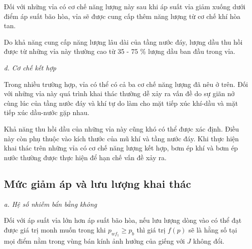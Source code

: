 \documentclass[12pt,a4paper]{report}
\begin{document}
Đối với những vỉa có cơ chế năng lượng này sau khi áp suất vỉa giảm xuống dưới điểm áp suất bão hòa, vỉa sẽ được cung cấp thêm năng lượng từ cơ chế khí hòa tan.

Do khả năng cung cấp năng lượng lâu dài của tầng nước đáy, lượng dầu thu hồi được từ những vỉa này thường cao từ 35 - 75 \% lượng dầu ban đầu trong vỉa.

\textit{d. Cơ chế kết hợp}

Trong nhiều trường hợp, vỉa có thể có cả ba cơ chế năng lượng đã nêu ở trên. Đối với những vỉa này quá trình khai thác thường dễ xảy ra vấn đề do sự giãn nở cùng lúc của tầng nước đáy và khí tự do làm cho mặt tiếp xúc khí-dầu và mặt tiếp xúc dầu-nước gặp nhau.

Khả năng thu hồi dầu của những vỉa này cũng khó có thể được xác định. Điều này còn phụ thuộc vào kích thước của mũ khí và tầng nước đáy. Khi thực hiện khai thác trên những vỉa có cơ chế năng lượng kết hợp, bơm ép khí và bơm ép nước thường được thực hiện để hạn chế vấn đề xảy ra.\\

\subsection{Mức giảm áp và lưu lượng khai thác}

\textit{a. Hệ số nhiễm bẩn bằng không}

Đối với áp suất vỉa lớn hơn áp suất bão hòa, nếu lưu lượng dòng vào có thể đạt được giá trị monh muốn trong khi $p_{wf_1} \geq p_b$ thì giá trị $f(p)$ sẽ là hằng số tại mọi điểm nằm trong vùng bán kính ảnh hưởng của giếng với $J$ không đổi.
\end{document}
